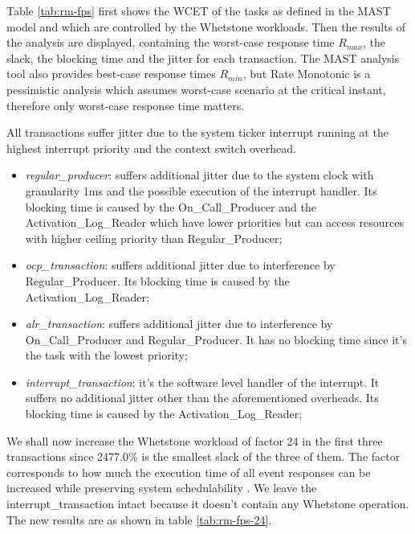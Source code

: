 \documentclass{article}
\begin{document}
Table \ref{tab:rm-fps} first shows the WCET of the tasks as defined in the MAST model and which are controlled by the Whetstone workloads. Then the results of the analysis are displayed, containing the worst-case response time $R_{max}$, the slack, the blocking time and the jitter for each transaction. The MAST analysis tool also provides best-case response times $R_{min}$, but Rate Monotonic is a pessimistic analysis which assumes worst-case scenario at the critical instant, therefore only worst-case response time matters.

All transactions suffer jitter due to the system ticker interrupt running at the highest interrupt priority and the context switch overhead.

\begin{itemize}
   \item \textit{regular\_producer}: suffers additional jitter due to the system clock with granularity 1ms and the possible execution of the interrupt handler. Its blocking time is caused by the On\_Call\_Producer and the Activation\_Log\_Reader which have lower priorities but can access resources with higher ceiling priority than Regular\_Producer;
   \item \textit{ocp\_transaction}: suffers additional jitter due to interference by Regular\_Producer. Its blocking time is caused by the Activation\_Log\_Reader;
   \item \textit{alr\_transaction}: suffers additional jitter due to interference by On\_Call\_Producer and Regular\_Producer. It has no blocking time since it's the task with the lowest priority;
   \item \textit{interrupt\_transaction}: it's the software level handler of the interrupt. It suffers no additional jitter other than the aforementioned overheads. Its blocking time is caused by the Activation\_Log\_Reader;
\end{itemize}

We shall now increase the Whetstone workload of factor 24 in the first three transactions since 2477.0\% is the smallest slack of the three of them. The factor corresponds to how much the execution time of all event responses can be increased while preserving system schedulability \cite{practitioner-growth}. We leave the {interrupt\_transaction} intact because it doesn't contain any Whetstone operation. The new results are as shown in table \ref{tab:rm-fps-24}.
\end{document}
